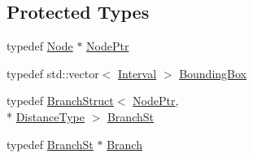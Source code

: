 \subsection*{Protected Types}
\begin{DoxyCompactItemize}
\item 
typedef \hyperlink{structnanoflann_1_1_k_d_tree_single_index_adaptor_1_1_node}{Node} $\ast$ \hyperlink{classnanoflann_1_1_k_d_tree_single_index_adaptor_a790d9a422739532c647e87e0f334b3c5}{Node\-Ptr}
\item 
typedef std\-::vector$<$ \hyperlink{structnanoflann_1_1_k_d_tree_single_index_adaptor_1_1_interval}{Interval} $>$ \hyperlink{classnanoflann_1_1_k_d_tree_single_index_adaptor_a4ba3fe322e4ded9cb1530476c971be24}{Bounding\-Box}
\item 
typedef \hyperlink{structnanoflann_1_1_k_d_tree_single_index_adaptor_1_1_branch_struct}{Branch\-Struct}$<$ \hyperlink{classnanoflann_1_1_k_d_tree_single_index_adaptor_a790d9a422739532c647e87e0f334b3c5}{Node\-Ptr}, \\*
\hyperlink{classnanoflann_1_1_k_d_tree_single_index_adaptor_addc764e7c19cc85c89b3903338e5a910}{Distance\-Type} $>$ \hyperlink{classnanoflann_1_1_k_d_tree_single_index_adaptor_adda19fa01ea32ec1df0e9c3e8f7aecc8}{Branch\-St}
\item 
typedef \hyperlink{classnanoflann_1_1_k_d_tree_single_index_adaptor_adda19fa01ea32ec1df0e9c3e8f7aecc8}{Branch\-St} $\ast$ \hyperlink{classnanoflann_1_1_k_d_tree_single_index_adaptor_ae84d5d1db0245a55ae3cb7f727f3ea79}{Branch}
\end{DoxyCompactItemize}
